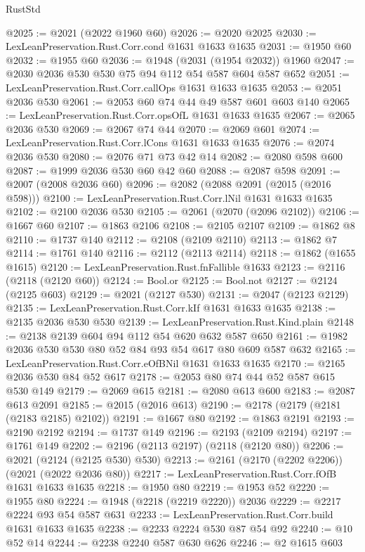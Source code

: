 \begin{lexlean}{RustStd}
\begin{coremodule}
@2025 := @2021 (@2022 @1960 @60)
@2026 := @2020 @2025
@2030 := LexLeanPreservation.Rust.Corr.cond @1631 @1633 @1635
@2031 := @1950 @60
@2032 := @1955 @60
@2036 := @1948 (@2031 (@1954 @2032)) @1960
@2047 := @2030 @2036 @530 @530 @75 @94 @112 @54 @587 @604 @587 @652
@2051 := LexLeanPreservation.Rust.Corr.callOps @1631 @1633 @1635
@2053 := @2051 @2036 @530
@2061 := @2053 @60 @74 @44 @49 @587 @601 @603 @140
@2065 := LexLeanPreservation.Rust.Corr.opsOfL @1631 @1633 @1635
@2067 := @2065 @2036 @530
@2069 := @2067 @74 @44
@2070 := @2069 @601
@2074 := LexLeanPreservation.Rust.Corr.lCons @1631 @1633 @1635
@2076 := @2074 @2036 @530
@2080 := @2076 @71 @73 @42 @14
@2082 := @2080 @598 @600
@2087 := @1999 @2036 @530 @60 @42 @60
@2088 := @2087 @598
@2091 := @2007 (@2008 @2036 @60)
@2096 := @2082 (@2088 @2091 (@2015 (@2016 @598)))
@2100 := LexLeanPreservation.Rust.Corr.lNil @1631 @1633 @1635
@2102 := @2100 @2036 @530
@2105 := @2061 (@2070 (@2096 @2102))
@2106 := @1667 @60
@2107 := @1863 @2106
@2108 := @2105 @2107
@2109 := @1862 @8
@2110 := @1737 @140
@2112 := @2108 (@2109 @2110)
@2113 := @1862 @7
@2114 := @1761 @140
@2116 := @2112 (@2113 @2114)
@2118 := @1862 (@1655 @1615)
@2120 := LexLeanPreservation.Rust.fnFallible @1633
@2123 := @2116 (@2118 (@2120 @60))
@2124 := Bool.or
@2125 := Bool.not
@2127 := @2124 (@2125 @603)
@2129 := @2021 (@2127 @530)
@2131 := @2047 (@2123 @2129)
@2135 := LexLeanPreservation.Rust.Corr.kIf @1631 @1633 @1635
@2138 := @2135 @2036 @530 @530
@2139 := LexLeanPreservation.Rust.Kind.plain
@2148 := @2138 @2139 @604 @94 @112 @54 @620 @632 @587 @650
@2161 := @1982 @2036 @530 @530 @80 @52 @84 @93 @54 @617 @80 @609 @587 @632
@2165 := LexLeanPreservation.Rust.Corr.eOfBNil @1631 @1633 @1635
@2170 := @2165 @2036 @530 @84 @52 @617
@2178 := @2053 @80 @74 @44 @52 @587 @615 @530 @149
@2179 := @2069 @615
@2181 := @2080 @613 @600
@2183 := @2087 @613 @2091
@2185 := @2015 (@2016 @613)
@2190 := @2178 (@2179 (@2181 (@2183 @2185) @2102))
@2191 := @1667 @80
@2192 := @1863 @2191
@2193 := @2190 @2192
@2194 := @1737 @149
@2196 := @2193 (@2109 @2194)
@2197 := @1761 @149
@2202 := @2196 (@2113 @2197) (@2118 (@2120 @80))
@2206 := @2021 (@2124 (@2125 @530) @530)
@2213 := @2161 (@2170 (@2202 @2206)) (@2021 (@2022 @2036 @80))
@2217 := LexLeanPreservation.Rust.Corr.fOfB @1631 @1633 @1635
@2218 := @1950 @80
@2219 := @1953 @52
@2220 := @1955 @80
@2224 := @1948 (@2218 (@2219 @2220)) @2036
@2229 := @2217 @2224 @93 @54 @587 @631
@2233 := LexLeanPreservation.Rust.Corr.build @1631 @1633 @1635
@2238 := @2233 @2224 @530 @87 @54 @92
@2240 := @10 @52 @14
@2244 := @2238 @2240 @587 @630 @626
@2246 := @2 @1615 @603

\end{coremodule}
\end{lexlean}
